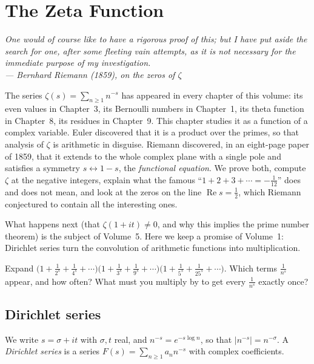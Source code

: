 \chapter{The Zeta Function}

\begin{center}\itshape
One would of course like to have a rigorous proof of this; but I have put aside the search for one, after some fleeting
vain attempts, as it is not necessary for the immediate purpose of my investigation.\\
\upshape --- Bernhard Riemann (1859), on the zeros of $\zeta$
\end{center}

The series $\zeta(s)=\sum_{n\ge1}n^{-s}$ has appeared in every chapter of this volume: its even values in Chapter~3, its
Bernoulli numbers in Chapter~1, its theta function in Chapter~8, its residues in Chapter~9. This chapter studies it
as a function of a complex variable. Euler discovered that it is a product over the primes, so that analysis of $\zeta$
is arithmetic in disguise. Riemann discovered, in an eight-page paper of 1859, that it extends to the whole complex plane
with a single pole and satisfies a symmetry $s\leftrightarrow1-s$, the \emph{functional equation}. We prove both, compute
$\zeta$ at the negative integers, explain what the famous ``$1+2+3+\cdots=-\frac1{12}$'' does and does not mean, and look at the
zeros on the line $\operatorname{Re}s=\frac12$, which Riemann conjectured to contain all the interesting ones.

What happens next (that $\zeta(1+it)\ne0$, and why this implies the prime number theorem) is the subject of Volume~5. Here we
keep a promise of Volume~1: Dirichlet series turn the convolution of arithmetic functions into multiplication.

\begin{think}
Expand $\bigl(1+\frac1{2^s}+\frac1{4^s}+\cdots\bigr)\bigl(1+\frac1{3^s}+\frac1{9^s}+\cdots\bigr)\bigl(1+\frac1{5^s}+\frac1{25^s}+\cdots\bigr)$. Which terms $\frac1{n^s}$ appear, and how often? What
must you multiply by to get every $\frac1{n^s}$ exactly once?
\end{think}

\section{Dirichlet series}

We write $s=\sigma+it$ with $\sigma,t$ real, and $n^{-s}=e^{-s\log n}$, so that $|n^{-s}|=n^{-\sigma}$. A \emph{Dirichlet series} is a series
$F(s)=\sum_{n\ge1}a_nn^{-s}$ with complex coefficients.

